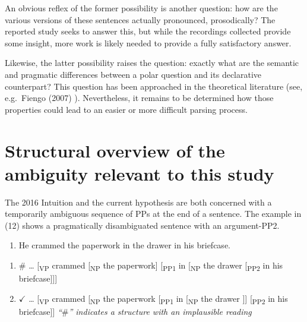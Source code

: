 \documentclass[12pt,oneside]{book}
\providecommand{\tightlist}{%
  \setlength{\itemsep}{0pt}\setlength{\parskip}{0pt}}
\begin{document}
An obvious reflex of the former possibility is another question: how are the various versions of these sentences actually pronounced, prosodically? The reported study seeks to answer this, but while the recordings collected provide some insight, more work is likely needed to provide a fully satisfactory answer.

Likewise, the latter possibility raises the question: exactly what are the semantic and pragmatic differences between a polar question and its declarative counterpart? This question has been approached in the theoretical literature (see, e.g.~Fiengo (2007) ). Nevertheless, it remains to be determined how those properties could lead to an easier or more difficult parsing process.

\hypertarget{mech}{%
\section{Structural overview of the ambiguity relevant to this study}\label{mech}}

The 2016 Intuition and the current hypothesis are both concerned with a temporarily ambiguous sequence of PPs at the end of a sentence. The example in (12) shows a pragmatically disambiguated sentence with an argument-PP2.

\begin{enumerate}
\def\labelenumi{(\arabic{enumi})}
\setcounter{enumi}{11}
\tightlist
\item
  He crammed the paperwork in the drawer in his briefcase.
\end{enumerate}

\begin{enumerate}
\def\labelenumi{\alph{enumi})}
\tightlist
\item
  \(\#\) \ldots{} {[}\textsubscript{VP} crammed {[}\textsubscript{NP} the paperwork{]} {[}\textsubscript{PP1} in {[}\textsubscript{NP} the drawer {[}\textsubscript{PP2} in his briefcase{]}{]}{]}
\item
  \(\checkmark\) \ldots{} {[}\textsubscript{VP} crammed {[}\textsubscript{NP} the paperwork {[}\textsubscript{PP1} in {[}\textsubscript{NP} the drawer {]}{]} {[}\textsubscript{PP2} in his briefcase{]}{]} \linebreak\nopagebreak
  \emph{``\(\#\)'' indicates a structure with an implausible reading}
\end{enumerate}
\end{document}
